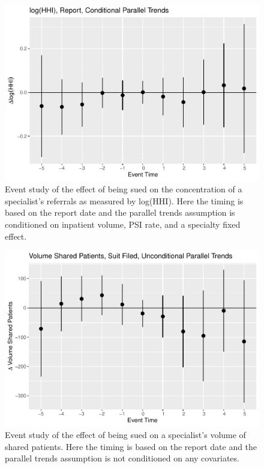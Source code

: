 \documentclass[
  12pt,
]{article}
\begin{document}
\FloatBarrier

\begin{figure}
\centering
\includegraphics{Paper_files/figure-latex/lhhirepestud-1.pdf}
\caption{\label{fig:lhhirepestud}Event study of the effect of being sued on the concentration of a specialist's referrals as measured by log(HHI). Here the timing is based on the report date and the parallel trends assumption is conditioned on inpatient volume, PSI rate, and a specialty fixed effect.}
\end{figure}

\FloatBarrier

\begin{figure}
\centering
\includegraphics{Paper_files/figure-latex/volsfestud-1.pdf}
\caption{\label{fig:volsfestud}Event study of the effect of being sued on a specialist's volume of shared patients. Here the timing is based on the report date and the parallel trends assumption is not conditioned on any covariates.}
\end{figure}
\end{document}
